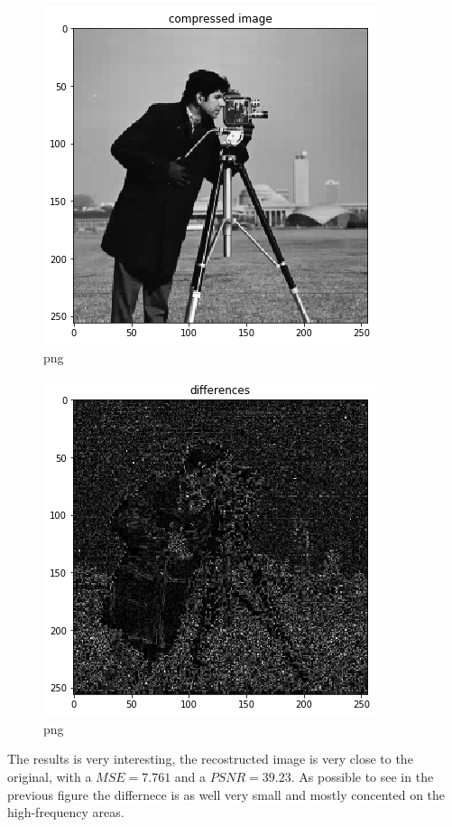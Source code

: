 \documentclass{letter}
\begin{document}
\begin{figure}[h]
  \begin{center}
    \includegraphics{output_15_2.png} 
  \end{center}
  \caption{png}
\end{figure}

\begin{figure}[h]
  \begin{center}
    \includegraphics{output_15_3.png} 
  \end{center}
  \caption{png}
\end{figure}

The results is very interesting, the recostructed image is very close to the
original, with a $MSE = 7.761$ and a $PSNR = 39.23$. As possible to see in the
previous figure the differnece is as well very small and mostly concented on
the high-frequency areas.
\end{document}
